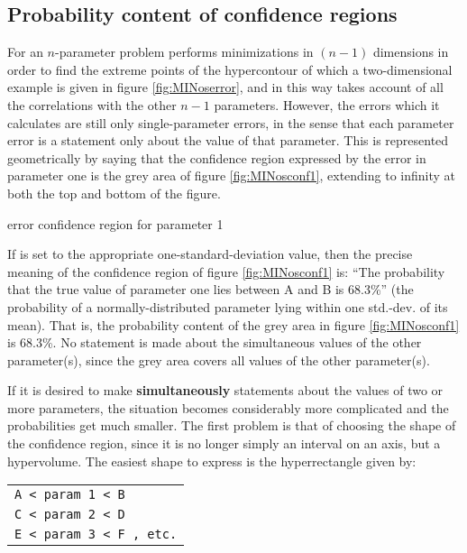 \subsection{Probability content of confidence regions}
 
For an $n$-parameter problem  performs 
minimizations in $(n-1)$
dimensions in order to find the extreme points of the hypercontour 
of which a two-dimensional example is given in figure 
\ref{fig:MINoserror}, and in this 
way takes account of all the correlations with the other $n-1$
parameters. 
However, the errors which it calculates are still only 
single-parameter errors, in the sense that each parameter error is 
a statement only about the value of that parameter. 
This is 
represented geometrically by saying that the confidence region 
expressed by the  error in parameter one is the grey
area of figure \ref{fig:MINosconf1}, 
extending to infinity at both the top and bottom of the figure.
 
\begin{Fighere}
\begin{center}
\mbox{}
\end{center}
\caption{\protect{} error confidence region for parameter 1}
\label{fig:MINosconf1}
\end{Fighere}
 
If  is set to the appropriate one-standard-deviation value, 
then the precise meaning of the confidence region of figure 
\ref{fig:MINosconf1} is:  ``The probability 
that the true value of parameter one lies between A and B is 68.3\%''
(the probability of a normally-distributed parameter lying within 
one std.-dev. of its mean). 
That is, the probability content of the 
grey area in figure \ref{fig:MINosconf1} is 68.3\%. 
No statement is made about 
the simultaneous values of the other parameter(s), since the grey
area covers all values of the other parameter(s).
 
If it is desired to make {\bf simultaneously} statements about the values 
of two or more parameters, the situation becomes considerably more 
complicated and the probabilities get much smaller. 
The first problem is 
that of choosing the shape of the confidence region, since it is no 
longer simply an interval on an axis, but a hypervolume. The easiest 
shape to express is the hyperrectangle given by: 

\begin{center}
\begin{tabular}{>{\tt}l}
A < param 1 < B \\
C < param 2 < D \\
E < param 3 < F , {\rm etc.}
\end{tabular}
\end{center}

